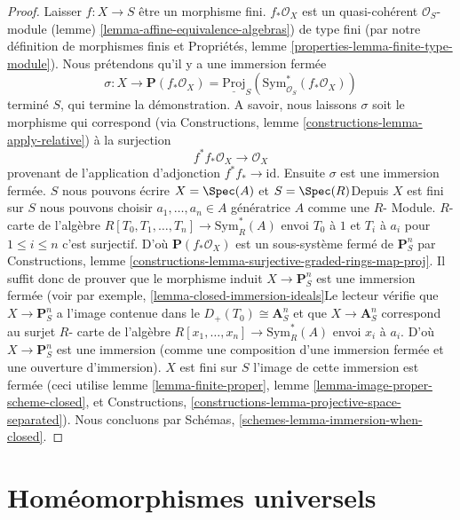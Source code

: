 \begin{proof}

Laisser $f : X \to S$ être un morphisme fini. $f_*\mathcal{O}_X$ est un quasi-cohérent $\mathcal{O}_S$-module (lemme) \ref{lemma-affine-equivalence-algebras}) de type fini (par notre définition de morphismes finis et Propriétés, lemme \ref{properties-lemma-finite-type-module}). Nous prétendons qu'il y a une immersion fermée
$$
\sigma :
X
\longrightarrow
\mathbf{P}(f_*\mathcal{O}_X) =
\underline{\text{Proj}}_S(\text{Sym}^*_{\mathcal{O}_S}(f_*\mathcal{O}_X))
$$
terminé $S$, qui termine la démonstration. A savoir, nous laissons $\sigma$ soit le morphisme qui correspond (via Constructions, lemme \ref{constructions-lemma-apply-relative}) à la surjection
$$
f^*f_*\mathcal{O}_X \longrightarrow \mathcal{O}_X
$$
provenant de l'application d'adjonction $f^*f_* \to \text{id}$. Ensuite $\sigma$
est une immersion fermée. $S$ nous pouvons écrire
$X = \Spec(A)$ et $S = \Spec(R)$Depuis $X$ est fini sur $S$
nous pouvons choisir $a_1, \ldots, a_n \in A$ génératrice $A$ comme une $R$- Module. $R$- carte de l'algèbre $R[T_0, T_1, \ldots, T_n] \to \text{Sym}_R^*(A)$
envoi $T_0$ à $1$ et $T_i$ à $a_i$ pour $1 \leq i \leq n$ c'est surjectif. D'où $\mathbf{P}(f_*\mathcal{O}_X)$ est un sous-système fermé de
$\mathbf{P}^n_S$ par Constructions, lemme
\ref{constructions-lemma-surjective-graded-rings-map-proj}. Il suffit donc de prouver que le morphisme induit
$X \to \mathbf{P}^n_S$ est une immersion fermée (voir par exemple, \ref{lemma-closed-immersion-ideals}Le lecteur vérifie que $X \to \mathbf{P}^n_S$ a l'image contenue dans le $D_+(T_0) \cong \mathbf{A}^n_S$ et que $X \to \mathbf{A}^n_S$
correspond au surjet $R$- carte de l'algèbre
$R[x_1, \ldots, x_n] \to \text{Sym}_R^*(A)$ envoi $x_i$ à $a_i$. D'où $X \to \mathbf{P}^n_S$ est une immersion (comme une composition d'une immersion fermée et une ouverture d'immersion).
$X$ est fini sur $S$ l'image de cette immersion est fermée (ceci utilise lemme \ref{lemma-finite-proper}, lemme \ref{lemma-image-proper-scheme-closed}, et Constructions, \ref{constructions-lemma-projective-space-separated}). Nous concluons par Schémas, \ref{schemes-lemma-immersion-when-closed}.

\end{proof}







\section{Homéomorphismes universels}
\label{section-universal-homeomorphisms}

